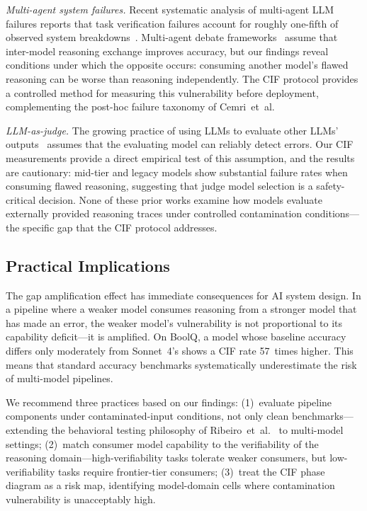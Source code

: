 \documentclass[aps,prx,reprint,twocolumn,superscriptaddress,longbibliography]{revtex4-2}
\begin{document}
\emph{Multi-agent system failures.}
Recent systematic analysis of multi-agent LLM failures reports that task verification failures account for roughly one-fifth of observed system breakdowns~\cite{cemri2025multi}. Multi-agent debate frameworks~\cite{du2023improving} assume that inter-model reasoning exchange improves accuracy, but our findings reveal conditions under which the opposite occurs: consuming another model's flawed reasoning can be worse than reasoning independently. The CIF protocol provides a controlled method for measuring this vulnerability before deployment, complementing the post-hoc failure taxonomy of Cemri~et~al.

\emph{LLM-as-judge.}
The growing practice of using LLMs to evaluate other LLMs' outputs~\cite{zheng2023judging} assumes that the evaluating model can reliably detect errors. Our CIF measurements provide a direct empirical test of this assumption, and the results are cautionary: mid-tier and legacy models show substantial failure rates when consuming flawed reasoning, suggesting that judge model selection is a safety-critical decision. None of these prior works examine how models evaluate externally provided reasoning traces under controlled contamination conditions---the specific gap that the CIF protocol addresses.

\subsection{Practical Implications}

The gap amplification effect has immediate consequences for AI system design. In a pipeline where a weaker model consumes reasoning from a stronger model that has made an error, the weaker model's vulnerability is not proportional to its capability deficit---it is amplified. On BoolQ, a model whose baseline accuracy differs only moderately from Sonnet~4's shows a CIF rate 57~times higher. This means that standard accuracy benchmarks systematically underestimate the risk of multi-model pipelines.

We recommend three practices based on our findings: (1)~evaluate pipeline components under contaminated-input conditions, not only clean benchmarks---extending the behavioral testing philosophy of Ribeiro~et~al.~\cite{ribeiro2020beyond} to multi-model settings; (2)~match consumer model capability to the verifiability of the reasoning domain---high-verifiability tasks tolerate weaker consumers, but low-verifiability tasks require frontier-tier consumers; (3)~treat the CIF phase diagram as a risk map, identifying model-domain cells where contamination vulnerability is unacceptably high.
\end{document}
